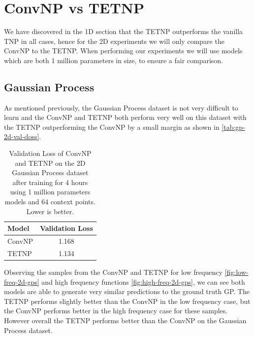 \documentclass[../../main.tex]{subfiles}
\begin{document}
\section{ConvNP vs TETNP}

We have discovered in the 1D section that the TETNP outperforms the vanilla TNP in all cases, hence for the 2D experiments we will only compare the ConvNP to the TETNP. When performing our experiments we will use models which are both 1 million parameters in size, to ensure a fair comparison.

\subsection{Gaussian Process}

As mentioned previously, the Gaussian Process dataset is not very difficult to learn and the ConvNP and TETNP both perform very well on this dataset with the TETNP outperforming the ConvNP by a small margin as shown in \autoref{tab:gp-2d-val-doss}.

\begin{table}[ht]
    \centering
    \begin{tabular}{lc}
        \toprule
        Model  & Validation Loss \\
        \midrule
        ConvNP & 1.168           \\
        TETNP  & 1.134           \\
        \bottomrule
    \end{tabular}
    \caption{Validation Loss of ConvNP and TETNP on the 2D Gaussian Process dataset after training for 4 hours using 1 million parameters models and 64 context points. Lower is better.}
    \label{tab:gp-2d-val-doss}
\end{table}

Observing the samples from the ConvNP and TETNP for low frequency \autoref{fig:low-freq-2d-gps} and high frequency functions \autoref{fig:high-freq-2d-gps}, we can see both models are able to generate very similar predictions to the ground truth GP. The TETNP performs slightly better than the ConvNP in the low frequency case, but the ConvNP performs better in the high frequency case for these samples. However overall the TETNP performs better than the ConvNP on the Gaussian Process dataset.
\end{document}
